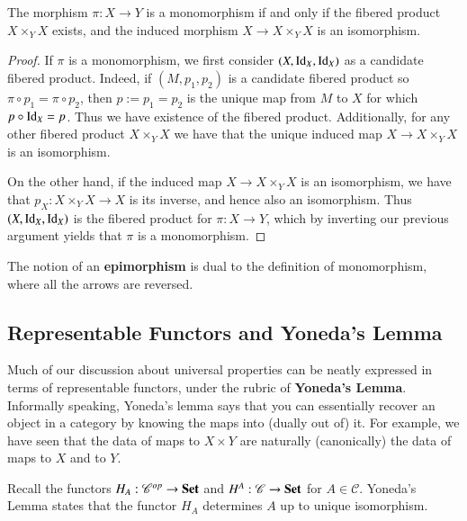 \begin{proposition}
    The morphism $\pi:X\rightarrow Y$ is a monomorphism if and only if the fibered product $X\times_YX$ exists, and the induced morphism $X\rightarrow X\times_YX$ is an isomorphism.
\end{proposition}
\begin{proof}
    If $\pi$ is a monomorphism, we first consider $(X,\operatorname{Id}_X,\operatorname{Id}_X)$ as a candidate fibered product. Indeed, if $(M,p_1,p_2)$ is a candidate fibered product so $\pi\circ p_1 = \pi\circ p_2$, then $p := p_1=p_2$ is the unique map from $M$ to $X$ for which $p\circ \operatorname{Id}_X = p$. Thus we have existence of the fibered product. Additionally, for any other fibered product $X\times_YX$ we have that the unique induced map $X\rightarrow X\times_YX$ is an isomorphism.

    On the other hand, if the induced map $X\rightarrow X\times_YX$ is an isomorphism, we have that $p_X:X\times_YX\rightarrow X$ is its inverse, and hence also an isomorphism. Thus $(X,\operatorname{Id}_X,\operatorname{Id}_X)$ is the fibered product for $\pi:X\rightarrow Y$, which by inverting our previous argument yields that $\pi$ is a monomorphism.
\end{proof}

The notion of an \textbf{epimorphism} is dual to the definition of monomorphism, where all the arrows are reversed.

\subsection{Representable Functors and Yoneda's Lemma}

Much of our discussion about universal properties can be neatly expressed in terms of representable functors, under the rubric of \textbf{Yoneda's Lemma}. Informally speaking, Yoneda's lemma says that you can essentially recover an object in a category by knowing the maps into (dually out of) it. For example, we have seen that the data of maps to $X\times Y$ are naturally (canonically) the data of maps to $X$ and to $Y$.

Recall the functors $H_A:\mathscr{C}^{op}\rightarrow \normalfont\textbf{Set}$ and $H^A:\mathscr{C}\rightarrow \normalfont\textbf{Set}$ for $A \in \mathscr{C}$. Yoneda's Lemma states that the functor $H_A$ determines $A$ up to unique isomorphism.

